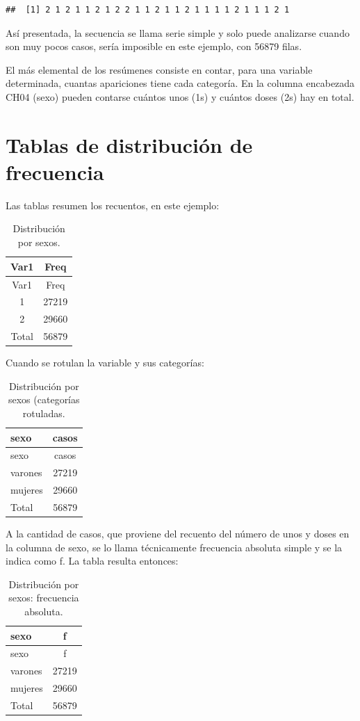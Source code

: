 \documentclass[]{book}
\begin{document}
\begin{verbatim}
##  [1] 2 1 2 1 1 2 1 2 2 1 1 2 1 1 2 1 1 1 1 2 1 1 1 2 1
\end{verbatim}

Así presentada, la secuencia se llama serie simple y solo puede analizarse cuando son muy pocos casos, sería imposible en este ejemplo, con 56879 filas.

El más elemental de los resúmenes consiste en contar, para una variable determinada, cuantas apariciones tiene cada categoría. En la columna encabezada CH04 (sexo) pueden contarse cuántos unos (1s) y cuántos doses (2s) hay en total.

\hypertarget{tablas-de-distribuciuxf3n-de-frecuencia}{%
\section{Tablas de distribución de frecuencia}\label{tablas-de-distribuciuxf3n-de-frecuencia}}

Las tablas resumen los recuentos, en este ejemplo:

\begin{longtable}[]{@{}cc@{}}
\caption{\label{tab:unnamed-chunk-19}Distribución por sexos.}\tabularnewline
\toprule
Var1 & Freq\tabularnewline
\midrule
\endfirsthead
\toprule
Var1 & Freq\tabularnewline
\midrule
\endhead
1 & 27219\tabularnewline
2 & 29660\tabularnewline
Total & 56879\tabularnewline
\bottomrule
\end{longtable}

Cuando se rotulan la variable y sus categorías:

\begin{longtable}[]{@{}lc@{}}
\caption{\label{tab:unnamed-chunk-20}Distribución por sexos (categorías rotuladas.}\tabularnewline
\toprule
sexo & casos\tabularnewline
\midrule
\endfirsthead
\toprule
sexo & casos\tabularnewline
\midrule
\endhead
varones & 27219\tabularnewline
mujeres & 29660\tabularnewline
Total & 56879\tabularnewline
\bottomrule
\end{longtable}

A la cantidad de casos, que proviene del recuento del número de unos y doses en la columna de sexo, se lo llama técnicamente frecuencia absoluta simple y se la indica como f. La tabla resulta entonces:

\begin{longtable}[]{@{}lc@{}}
\caption{\label{tab:unnamed-chunk-21}Distribución por sexos: frecuencia absoluta.}\tabularnewline
\toprule
sexo & f\tabularnewline
\midrule
\endfirsthead
\toprule
sexo & f\tabularnewline
\midrule
\endhead
varones & 27219\tabularnewline
mujeres & 29660\tabularnewline
Total & 56879\tabularnewline
\bottomrule
\end{longtable}
\end{document}
